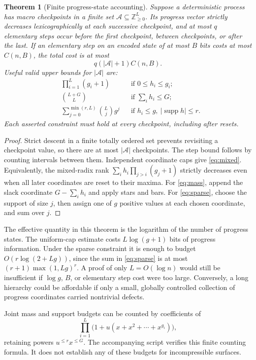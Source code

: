 \documentclass[11pt,letterpaper]{article}
\newtheorem{theorem}{Theorem}[section]
\theoremstyle{definition}
\newcommand{\Z}{\mathbb Z}
\newcommand{\supp}{\operatorname{supp}}
\begin{document}
\begin{theorem}[Finite progress-state accounting]\label{thm:progress}
Suppose a deterministic process has macro checkpoints in a finite set
\(\mathcal A\subseteq\Z_{\geq0}^L\). Its progress vector strictly decreases lexicographically at each successive checkpoint, and at most \(q\) elementary steps occur before the first checkpoint, between checkpoints, or after the last. If an elementary step on an encoded state of at most \(B\) bits costs at most \(C(n,B)\), the total cost is at most
\[
 q(|\mathcal A|+1)C(n,B).
\]
Useful valid upper bounds for \(|\mathcal A|\) are:
\begin{align}
 &\prod_{i=1}^L(g_i+1)
 &&\text{if }0\leq h_i\leq g_i;\label{eq:mixed}\\
 &\binom{L+G}{L}
 &&\text{if }\sum_i h_i\leq G;\label{eq:mass}\\
 &\sum_{j=0}^{\min(r,L)}\binom Lj g^j
 &&\text{if }h_i\leq g,\ |\supp h|\leq r.\label{eq:sparse}
\end{align}
Each asserted constraint must hold at every checkpoint, including after resets.
\end{theorem}
\begin{proof}
Strict descent in a finite totally ordered set prevents revisiting a checkpoint value, so there are at most \(|\mathcal A|\) checkpoints. The step bound follows by counting intervals between them. Independent coordinate caps give \cref{eq:mixed}. Equivalently, the mixed-radix rank
\(\sum_i h_i\prod_{j>i}(g_j+1)\) strictly decreases even when all later coordinates are reset to their maxima. For \cref{eq:mass}, append the slack coordinate \(G-\sum_i h_i\) and apply stars and bars. For \cref{eq:sparse}, choose the support of size \(j\), then assign one of \(g\) positive values at each chosen coordinate, and sum over \(j\).
\end{proof}

The effective quantity in this theorem is the logarithm of the number of progress states. The uniform-cap estimate costs \(L\log(g+1)\) bits of progress information. Under the sparse constraint it is enough to budget
\(O(r\log(2+Lg))\), since the sum in \cref{eq:sparse} is at most
\((r+1)\max(1,Lg)^r\). A proof of only \(L=O(\log n)\) would still be insufficient if \(\log g\), \(B\), or elementary step cost were too large. Conversely, a long hierarchy could be affordable if only a small, globally controlled collection of progress coordinates carried nontrivial defects.

Joint mass and support budgets can be counted by coefficients of
\[
 \prod_{i=1}^L\bigl(1+u(x+x^2+\cdots+x^{g_i})\bigr),
\]
retaining powers \(u^{\leq r}x^{\leq G}\). The accompanying script verifies this finite counting formula. It does not establish any of these budgets for incompressible surfaces.
\end{document}
